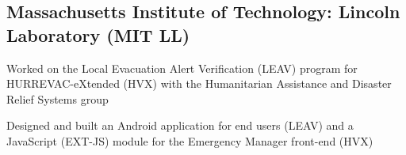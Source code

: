 \documentclass[a4paper]{article}
\newcommand\VRule{\color{lightgray}\vrule width 0.5pt}
\renewenvironment{itemize}{
	\begin{list}{}{
		\setlength{\leftmargin}{1.5em}
	}
}{\end{list}}
\begin{document}
\subsection*{Massachusetts Institute of Technology: Lincoln Laboratory (MIT LL)}
\begin{itemize}
  \item Worked on the Local Evacuation Alert Verification (LEAV) program for HURREVAC-eXtended (HVX) with the Humanitarian Assistance and Disaster Relief Systems group
  \item Designed and built an Android application for end users (LEAV) and a JavaScript (EXT-JS) module for the Emergency Manager front-end (HVX)
\end{itemize}





\end{document}
